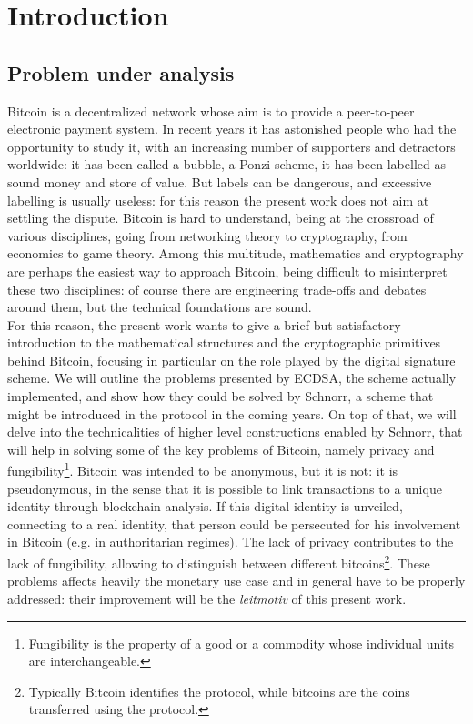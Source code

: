 \chapter{Introduction}
\label{chpr:intro}
\section{Problem under analysis}

Bitcoin \cite{BTC} is a decentralized network whose aim is to provide a peer-to-peer electronic payment system. In recent years it has astonished people who had the opportunity to study it, with an increasing number of supporters and detractors worldwide: it has been called a bubble, a Ponzi scheme, it has been labelled as sound money and store of value. But labels can be dangerous, and excessive labelling is usually useless: for this reason the present work does not aim at settling the dispute. Bitcoin is hard to understand, being at the crossroad of various disciplines, going from networking theory to cryptography, from economics to game theory. Among this multitude, mathematics and cryptography are perhaps the easiest way to approach Bitcoin, being difficult to misinterpret these two disciplines: of course there are engineering trade-offs and debates around them, but the technical foundations are sound.
\\
For this reason, the present work wants to give a brief but satisfactory introduction to the mathematical structures and the cryptographic primitives behind Bitcoin, focusing in particular on the role played by the digital signature scheme. We will outline the problems presented by ECDSA, the scheme actually implemented, and show how they could be solved by Schnorr, a scheme that might be introduced in the protocol in the coming years. On top of that, we will delve into the technicalities of higher level constructions enabled by Schnorr, that will help in solving some of the key problems of Bitcoin, namely privacy and fungibility\footnote{Fungibility is the property of a good or a commodity whose individual units are interchangeable.}. Bitcoin was intended to be anonymous, but it is not: it is pseudonymous, in the sense that it is possible to link transactions to a unique identity through blockchain analysis. If this digital identity is unveiled, connecting to a real identity, that person could be persecuted for his involvement in Bitcoin (e.g. in authoritarian regimes). The lack of privacy contributes to the lack of fungibility, allowing to distinguish between different bitcoins\footnote{Typically Bitcoin identifies the protocol, while bitcoins are the coins transferred using the protocol.}. These problems affects heavily the monetary use case and in general have to be properly addressed: their improvement will be the \textit{leitmotiv} of this present work.

